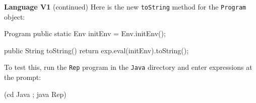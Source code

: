 \begin{minipage}[t]{\sw}
\slidenumber
\LARGE
{\bf Language V1} (continued)\exx
Here is the new \verb'toString' method for the \verb'Program' object:
\begin{qv}
Program
    public static Env initEnv = Env.initEnv();

    public String toString() {
        return exp.eval(initEnv).toString();
    }
\end{qv}
To test this, run the \verb'Rep' program in the \verb'Java' directory
and enter expressions at the prompt:
\begin{qv}
(cd Java ; java Rep)
\end{qv}
\end{minipage}
